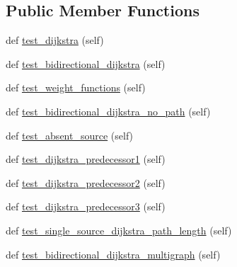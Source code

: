 \subsection*{Public Member Functions}
\begin{DoxyCompactItemize}
\item 
def \hyperlink{classnetworkx_1_1algorithms_1_1shortest__paths_1_1tests_1_1test__weighted_1_1TestWeightedPath_ae1874696674db764b1965489611cc91c}{test\+\_\+dijkstra} (self)
\item 
def \hyperlink{classnetworkx_1_1algorithms_1_1shortest__paths_1_1tests_1_1test__weighted_1_1TestWeightedPath_adba5ab3b3abf6483d9aea4840a772e08}{test\+\_\+bidirectional\+\_\+dijkstra} (self)
\item 
def \hyperlink{classnetworkx_1_1algorithms_1_1shortest__paths_1_1tests_1_1test__weighted_1_1TestWeightedPath_a5da682d0392cb1047b574101147e74bb}{test\+\_\+weight\+\_\+functions} (self)
\item 
def \hyperlink{classnetworkx_1_1algorithms_1_1shortest__paths_1_1tests_1_1test__weighted_1_1TestWeightedPath_a22bde9f9ce234bf573225b11bead1502}{test\+\_\+bidirectional\+\_\+dijkstra\+\_\+no\+\_\+path} (self)
\item 
def \hyperlink{classnetworkx_1_1algorithms_1_1shortest__paths_1_1tests_1_1test__weighted_1_1TestWeightedPath_ab102d1848f9f27114c6e8bae6220f6bc}{test\+\_\+absent\+\_\+source} (self)
\item 
def \hyperlink{classnetworkx_1_1algorithms_1_1shortest__paths_1_1tests_1_1test__weighted_1_1TestWeightedPath_a0abf859186ec8f0e50bf5680218b52ff}{test\+\_\+dijkstra\+\_\+predecessor1} (self)
\item 
def \hyperlink{classnetworkx_1_1algorithms_1_1shortest__paths_1_1tests_1_1test__weighted_1_1TestWeightedPath_a8d82d37256cc93dba3a2e99701320b7d}{test\+\_\+dijkstra\+\_\+predecessor2} (self)
\item 
def \hyperlink{classnetworkx_1_1algorithms_1_1shortest__paths_1_1tests_1_1test__weighted_1_1TestWeightedPath_a5c3253a0e8c5bcd7224e04792a387359}{test\+\_\+dijkstra\+\_\+predecessor3} (self)
\item 
def \hyperlink{classnetworkx_1_1algorithms_1_1shortest__paths_1_1tests_1_1test__weighted_1_1TestWeightedPath_a9b91afe6561cda2781d731648bf6454d}{test\+\_\+single\+\_\+source\+\_\+dijkstra\+\_\+path\+\_\+length} (self)
\item 
def \hyperlink{classnetworkx_1_1algorithms_1_1shortest__paths_1_1tests_1_1test__weighted_1_1TestWeightedPath_aaec77aa2395a7b63ef528af333578c72}{test\+\_\+bidirectional\+\_\+dijkstra\+\_\+multigraph} (self)

\end{DoxyCompactItemize}
